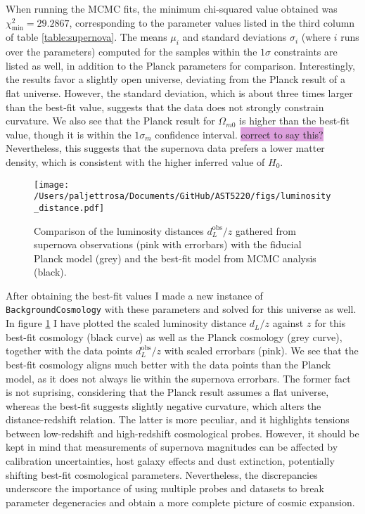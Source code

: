 \documentclass{aa}
\begin{document}
When running the MCMC fits, the minimum chi-squared value obtained was $\chi^2_\text{min}=29.2867$, corresponding to the parameter values listed in the third column of table \ref{table:supernova}. The means $\mu_i$ and standard deviations $\sigma_i$ (where $i$ runs over the parameters) computed for the samples within the $1\sigma$ constraints are listed as well, in addition to the Planck parameters for comparison. Interestingly, the results favor a slightly open universe, deviating from the Planck result of a flat universe. However, the standard deviation, which is about three times larger than the best-fit value, suggests that the data does not strongly constrain curvature. We also see that the Planck result for $\Omega_{m0}$ is higher than the best-fit value, though it is within the $1\sigma_m$ confidence interval. \colorbox{Plum}{correct to say this?} Nevertheless, this suggests that the supernova data prefers a lower matter density, which is consistent with the higher inferred value of $H_0$. 

\begin{figure}
    \centering
    \texttt{[image: /Users/paljettrosa/Documents/GitHub/AST5220/figs/luminosity\_distance.pdf]}
    \caption{Comparison of the luminosity distances $d_L^\text{obs}/z$ gathered from supernova observations (pink with errorbars) with the fiducial Planck model (grey) and the best-fit model from MCMC analysis (black).}\label{fig:luminosity distance}
\end{figure}

After obtaining the best-fit values I made a new instance of \verb|BackgroundCosmology| with these parameters and solved for this universe as well. In figure \ref{fig:luminosity distance} I have plotted the scaled luminosity distance $d_L/z$ against $z$ for this best-fit cosmology (black curve) as well as the Planck cosmology (grey curve), together with the data points $d_L^\text{obs}/z$ with scaled errorbars (pink). We see that the best-fit cosmology aligns much better with the data points than the Planck model, as it does not always lie within the supernova errorbars. The former fact is not suprising, considering that the Planck result assumes a flat universe, whereas the best-fit suggests slightly negative curvature, which alters the distance-redshift relation. The latter is more peculiar, and it highlights tensions between low-redshift and high-redshift cosmological probes. However, it should be kept in mind that measurements of supernova magnitudes can be affected by calibration uncertainties, host galaxy effects and dust extinction, potentially shifting best-fit cosmological parameters. Nevertheless, the discrepancies underscore the importance of using multiple probes and datasets to break parameter degeneracies and obtain a more complete picture of cosmic expansion.
\end{document}
